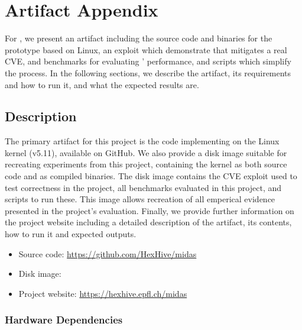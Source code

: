 \section{Artifact Appendix}

For \midas{}, we present an artifact including the source code and 
binaries for the prototype based on Linux, an exploit which demonstrate 
that \midas{} mitigates a real CVE, and benchmarks for evaluating 
\midas{}' performance, and scripts which simplify the process.
In the following sections, we describe the artifact, its requirements 
and how to run it, and what the expected results are.


\subsection{Description}


The primary artifact for this project is the code implementing \midas{} on the
Linux kernel (v5.11), available on GitHub.
We also provide a disk image suitable for recreating experiments from this
project, containing the kernel as both source code and as compiled binaries.
The disk image contains the CVE exploit used to test correctness in the 
project, all benchmarks evaluated in this project, and scripts to run these.
This image allows recreation of all emperical evidence presented in the 
project's evaluation.
Finally, we provide further information on the project website including
a detailed description of the artifact, its contents, how to run it 
and expected outputs.
\begin{itemize}
  \item Source code: \url{https://github.com/HexHive/midas}
  \item Disk image: \zenodorecord
  \item Project website: \url{https://hexhive.epfl.ch/midas}
\end{itemize}

\subsubsection{Hardware Dependencies}

